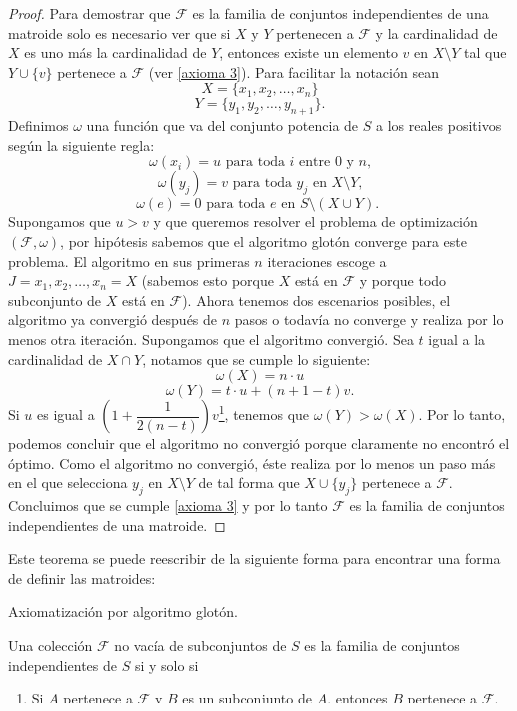 \begin{proof}
Para demostrar que $\mathcal{F}$ es la familia de conjuntos independientes de una matroide solo es necesario ver que si $X$ y $Y$ pertenecen a $\mathcal{F}$ y la cardinalidad de $X$ es uno más la cardinalidad de $Y$, entonces existe un elemento $v$ en $X \setminus Y$ tal que $Y \cup \{v\} $ pertenece a $\mathcal{F}$ (ver \ref{axioma 3}). Para facilitar la notación sean 
$$X = \{x_1,x_2,\dots,x_n \}$$ $$Y = \{y_1,y_2,\dots,y_{n+1}\}.$$
Definimos $\omega$ una función que va del conjunto potencia de $S$ a los reales positivos según la siguiente regla:
$$\omega(x_i)=u \text{ para toda $i$ entre $0$ y $n$,}$$
$$\omega(y_j)=v \text{ para toda $y_j$ en $X \setminus Y$,}$$
$$\omega(e)=0 \text{ para toda $e$ en $S \setminus(X \cup Y)$. }$$
Supongamos que $u>v$ y que queremos resolver el problema de optimización $(\mathcal{F}, \omega)$, por hipótesis sabemos que el algoritmo glotón converge para este problema. El algoritmo en sus primeras $n$ iteraciones escoge a $J={x_1,x_2,\dots,x_n}=X$ (sabemos esto porque $X$ está en $\mathcal{F}$ y porque todo subconjunto de $X$ está en $\mathcal{F}$). Ahora tenemos dos escenarios posibles, el algoritmo ya convergió después de $n$ pasos o todavía no converge y realiza por lo menos otra iteración. 
Supongamos que el algoritmo convergió. Sea $t$ igual a la cardinalidad de $X \cap Y$, notamos que se cumple lo siguiente:
$$\omega(X)= n\cdot u$$
$$\omega(Y) = t \cdot u + (n+1-t)v.$$
Si $u$ es igual a $\left(1+\dfrac{1}{2(n-t)}\right)v$\footnote{Con este supuesto se sigue cumpliendo que $u>v$.}, tenemos que $ \omega(Y) > \omega(X)$. Por lo tanto, podemos concluir que el algoritmo no convergió porque claramente no encontró el óptimo. Como el algoritmo no convergió, éste realiza por lo menos un paso más en el que selecciona $y_j$ en $X \setminus Y$ de tal forma que $X \cup \{y_j\}$ pertenece a $\mathcal{F}$. Concluimos que se cumple \ref{axioma 3} y por lo tanto $\mathcal{F}$ es la familia de conjuntos independientes de una matroide. 
\end{proof}

Este teorema se puede reescribir de la siguiente forma para encontrar una forma de definir las matroides:

\begin{cor}{Axiomatización por algoritmo glotón.}

Una colección $\mathcal{F}$ no vacía de subconjuntos de $S$ es la familia de conjuntos independientes de $S$ si y solo si 
\begin{enumerate}
\item Si $A$ pertenece a $\mathcal{F}$ y $B$ es un subconjunto de $A$, entonces $B$ pertenece a $\mathcal{F}$.
\item Para toda función $\omega$ que va de $S$ a los reales positivos el algoritmo glotón escoge al conjunto $A$ en $\mathcal{F}$ que maximiza la función 
$$f(A) = \sum_{k=1}^{n}\omega(a_k) \text{ con } A=\{a_1,\dots,a_n\}$$ es decir, no existe $B$ en $\mathcal{F}$ tal que $f(B)>f(A)$.
\end{enumerate}
\end{cor}

\begin{proof}
El corolario es un caso particular del teorema \ref{axiomas gloton}.
\end{proof}



